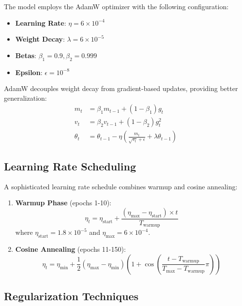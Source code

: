 The model employs the AdamW optimizer with the following configuration:

\begin{itemize}
    \item \textbf{Learning Rate}: $\eta = 6 \times 10^{-4}$
    \item \textbf{Weight Decay}: $\lambda = 6 \times 10^{-5}$
    \item \textbf{Betas}: $\beta_1 = 0.9, \beta_2 = 0.999$
    \item \textbf{Epsilon}: $\epsilon = 10^{-8}$
\end{itemize}

AdamW decouples weight decay from gradient-based updates, providing better generalization:
\begin{align}
m_t &= \beta_1 m_{t-1} + (1-\beta_1)g_t \\
v_t &= \beta_2 v_{t-1} + (1-\beta_2)g_t^2 \\
\theta_t &= \theta_{t-1} - \eta\left(\frac{m_t}{\sqrt{v_t} + \epsilon} + \lambda\theta_{t-1}\right)
\end{align}

\subsection{Learning Rate Scheduling}
\label{subsec:lr_scheduling}

A sophisticated learning rate schedule combines warmup and cosine annealing:

\begin{enumerate}
    \item \textbf{Warmup Phase} (epochs 1-10):
    \begin{equation}
    \eta_t = \eta_{\text{start}} + \frac{(\eta_{\text{max}} - \eta_{\text{start}}) \times t}{T_{\text{warmup}}}
    \end{equation}
    where $\eta_{\text{start}} = 1.8 \times 10^{-5}$ and $\eta_{\text{max}} = 6 \times 10^{-4}$.
    
    \item \textbf{Cosine Annealing} (epochs 11-150):
    \begin{equation}
    \eta_t = \eta_{\text{min}} + \frac{1}{2}(\eta_{\text{max}} - \eta_{\text{min}})\left(1 + \cos\left(\frac{t - T_{\text{warmup}}}{T_{\text{max}} - T_{\text{warmup}}}\pi\right)\right)
    \end{equation}
\end{enumerate}

\subsection{Regularization Techniques}
\label{subsec:regularization}

